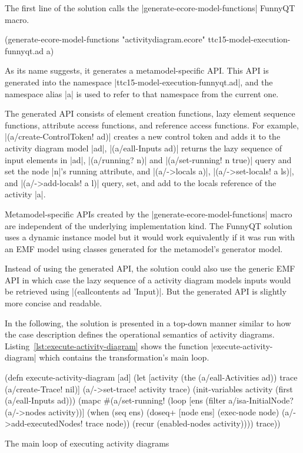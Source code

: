 \documentclass[submission]{eptcs}
\newcommand{\code}{\clojureinline}
\begin{document}
The first line of the solution calls the \code|generate-ecore-model-functions|
FunnyQT macro.

\begin{clojurecode}
(generate-ecore-model-functions "activitydiagram.ecore" ttc15-model-execution-funnyqt.ad a)
\end{clojurecode}

As its name suggests, it generates a metamodel-specific API.  This API is
generated into the namespace \code|ttc15-model-execution-funnyqt.ad|, and the
namespace alias \code|a| is used to refer to that namespace from the current
one.

The generated API consists of element creation functions, lazy element sequence
functions, attribute access functions, and reference access functions.  For
example, \code|(a/create-ControlToken! ad)| creates a new control token and
adds it to the activity diagram model \code|ad|, \code|(a/eall-Inputs ad)|
returns the lazy sequence of input elements in \code|ad|, \code|(a/running? n)|
and \code|(a/set-running! n true)| query and set the node \code|n|'s
\textsf{running} attribute, and \code|(a/->locals a)|, \code|(a/->set-locals! a
ls)|, and \code|(a/->add-locals! a l)| query, set, and add to the
\textsf{locals} reference of the activity \code|a|.

Metamodel-specific APIs created by the \code|generate-ecore-model-functions|
macro are independent of the underlying implementation kind.  The FunnyQT
solution uses a dynamic instance model but it would work equivalently if it was
run with an EMF model using classes generated for the metamodel's generator
model.

Instead of using the generated API, the solution could also use the generic EMF
API in which case the lazy sequence of a activity diagram models inputs would
be retrieved using \code|(eallcontents ad 'Input)|.  But the generated API is
slightly more concise and readable.

\bigskip{}

In the following, the solution is presented in a top-down manner similar to how
the case description defines the operational semantics of activity diagrams.
Listing~\vref{lst:execute-activity-diagram} shows the function
\code|execute-activity-diagram| which contains the transformation's main loop.

\begin{listing}[h!tb]
\begin{clojurecode}
(defn execute-activity-diagram [ad]
  (let [activity (the (a/eall-Activities ad))
        trace (a/create-Trace! nil)]
    (a/->set-trace! activity trace)
    (init-variables activity (first (a/eall-Inputs ad)))
    (mapc #(a/set-running! %
    (loop [ens (filter a/isa-InitialNode? (a/->nodes activity))]
      (when (seq ens)
        (doseq+ [node ens]
          (exec-node node)
          (a/->add-executedNodes! trace node))
        (recur (enabled-nodes activity))))
    trace))
\end{clojurecode}
\caption{The main loop of executing activity diagrams}
\label{lst:execute-activity-diagram}
\end{listing}
\end{document}
